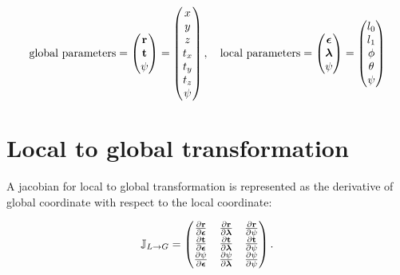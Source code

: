 \documentclass[12pt,a4paper]{scrarticle}
\begin{document}
\begin{equation}
    \textrm{global parameters} = 
    \begin{pmatrix}
    \mathbf{r} \\
    \mathbf{t} \\
    \psi
    \end{pmatrix} 
    =
    \begin{pmatrix}
    x \\
    y \\
    z \\
    t_x \\
    t_y \\
    t_z \\
    \psi
    \end{pmatrix},     
    \quad
    \textrm{local parameters} = 
    \begin{pmatrix}
    \boldsymbol{\epsilon} \\
    \boldsymbol{\lambda} \\
    \psi
    \end{pmatrix}
    =
    \begin{pmatrix}
    l_0 \\
    l_1 \\
    \phi \\
    \theta \\
    \psi
    \end{pmatrix}    
\end{equation}
 
\section{Local to global transformation}

A jacobian for local to global transformation is represented as the derivative of global coordinate with respect to the local coordinate:

\begin{equation}\label{eq:jacobi}
    \mathbb{J}_{L \rightarrow G} = 
    \begin{pmatrix}
     \frac{\partial{\mathbf{r}}}{\partial{\boldsymbol{\epsilon}}} & \frac{\partial{\mathbf{r}}}{\partial{\boldsymbol{\lambda}}} & \frac{\partial{\mathbf{r}}}{\partial{\psi}} \\
     \frac{\partial{\mathbf{t}}}{\partial{\boldsymbol{\epsilon}}} & \frac{\partial{\mathbf{t}}}{\partial{\boldsymbol{\lambda}}} & \frac{\partial{\mathbf{t}}}{\partial{\psi}} \\
    \frac{\partial{\psi}}{\partial{\boldsymbol{\epsilon}}} & \frac{\partial{\psi}}{\partial{\boldsymbol{\lambda}}} & \frac{\partial{\psi}}{\partial{\psi}}
    \end{pmatrix}.
\end{equation}
\end{document}
